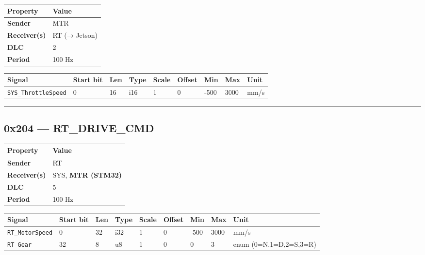 \begin{longtable}[]{@{}ll@{}}
\toprule\noalign{}
Property & Value \\
\midrule\noalign{}
\endhead
\bottomrule\noalign{}
\endlastfoot
\textbf{Sender} & MTR \\
\textbf{Receiver(s)} & RT (→ Jetson) \\
\textbf{DLC} & 2 \\
\textbf{Period} & 100 Hz \\
\end{longtable}

\begin{longtable}[]{@{}lllllllll@{}}
\toprule\noalign{}
Signal & Start bit & Len & Type & Scale & Offset & Min & Max & Unit \\
\midrule\noalign{}
\endhead
\bottomrule\noalign{}
\endlastfoot
\texttt{SYS\_ThrottleSpeed} & 0 & 16 & i16 & 1 & 0 & -500 & 3000 & mm/s \\
\end{longtable}

\begin{center}\rule{0.5\linewidth}{0.5pt}\end{center}

\subsection{0x204 --- RT\_DRIVE\_CMD}\label{x204-rt_drive_cmd}

\begin{longtable}[]{@{}ll@{}}
\toprule\noalign{}
Property & Value \\
\midrule\noalign{}
\endhead
\bottomrule\noalign{}
\endlastfoot
\textbf{Sender} & RT \\
\textbf{Receiver(s)} & SYS, \textbf{MTR (STM32)} \\
\textbf{DLC} & 5 \\
\textbf{Period} & 100 Hz \\
\end{longtable}

\begin{longtable}[]{@{}lllllllll@{}}
\toprule\noalign{}
Signal & Start bit & Len & Type & Scale & Offset & Min & Max & Unit \\
\midrule\noalign{}
\endhead
\bottomrule\noalign{}
\endlastfoot
\texttt{RT\_MotorSpeed} & 0 & 32 & i32 & 1 & 0 & -500 & 3000 & mm/s \\
\texttt{RT\_Gear} & 32 & 8 & u8 & 1 & 0 & 0 & 3 & enum (0=N,1=D,2=S,3=R) \\
\end{longtable}

